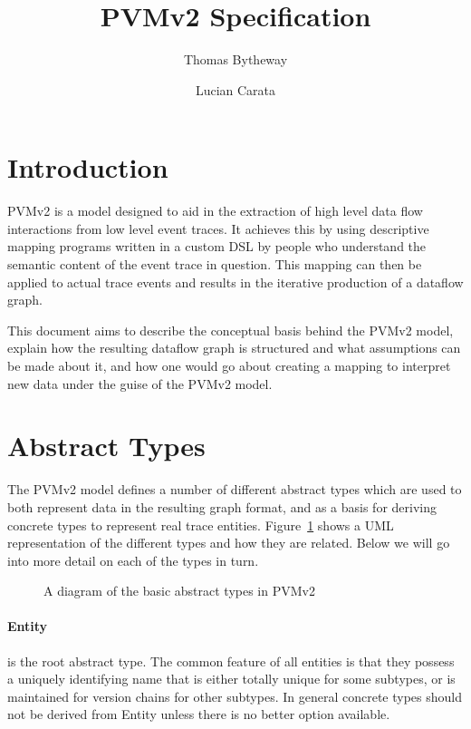 \documentclass[12pt,twoside,a4paper]{article}
\begin{document}
\title{PVMv2 Specification}
\author{Thomas Bytheway \and Lucian Carata}

\maketitle

\clearpage

\section{Introduction}
PVMv2 is a model designed to aid in the extraction of high level data flow interactions from low level event traces. It achieves this by using descriptive mapping programs written in a custom DSL by people who understand the semantic content of the event trace in question. This mapping can then be applied to actual trace events and results in the iterative production of a dataflow graph.

This document aims to describe the conceptual basis behind the PVMv2 model, explain how the resulting dataflow graph is structured and what assumptions can be made about it, and how one would go about creating a mapping to interpret new data under the guise of the PVMv2 model.

\section{Abstract Types}
\label{sec:ty}
The PVMv2 model defines a number of different abstract types which are used to both represent data in the resulting graph format, and as a basis for deriving concrete types to represent real trace entities. Figure~\ref{fig:types} shows a UML representation of the different types and how they are related. Below we will go into more detail on each of the types in turn.

\begin{figure}[h]
\centering

\caption{A diagram of the basic abstract types in PVMv2}
\label{fig:types}
\end{figure}

\paragraph{Entity}
\label{sec:ty:entity}
 is the root abstract type. The common feature of all entities is that they possess a uniquely identifying name that is either totally unique for some subtypes, or is maintained for version chains for other subtypes. In general concrete types should not be derived from Entity unless there is no better option available.
\end{document}
